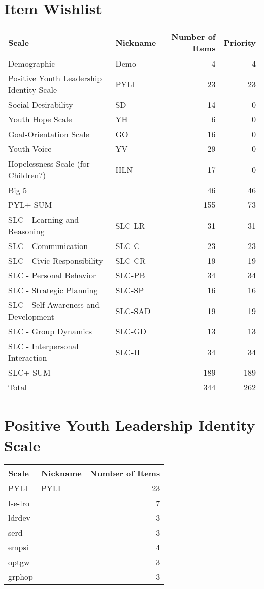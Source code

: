 \documentclass[11pt]{article}
\author{ALEX}
\date{\today}
\title{}
\begin{document}
\tableofcontents

\section{Item Wishlist}
\label{sec:org3b86273}

\begin{center}
\begin{tabular}{llrr}
\hline
Scale & Nickname & Number of Items & Priority\\
\hline
\hline
Demographic & Demo & 4 & 4\\
Positive Youth Leadership Identity Scale & PYLI & 23 & 23\\
Social Desirability & SD & 14 & 0\\
Youth Hope Scale & YH & 6 & 0\\
Goal-Orientation Scale & GO & 16 & 0\\
Youth Voice & YV & 29 & 0\\
Hopelessness Scale (for Children?) & HLN & 17 & 0\\
Big 5 &  & 46 & 46\\
\hline
PYL+ SUM &  & 155 & 73\\
\hline
SLC - Learning and Reasoning & SLC-LR & 31 & 31\\
SLC - Communication & SLC-C & 23 & 23\\
SLC - Civic Responsibility & SLC-CR & 19 & 19\\
SLC - Personal Behavior & SLC-PB & 34 & 34\\
SLC - Strategic Planning & SLC-SP & 16 & 16\\
SLC - Self Awareness and Development & SLC-SAD & 19 & 19\\
SLC - Group Dynamics & SLC-GD & 13 & 13\\
SLC - Interpersonal Interaction & SLC-II & 34 & 34\\
\hline
SLC+ SUM &  & 189 & 189\\
\hline
Total &  & 344 & 262\\
\end{tabular}
\end{center}

\section{Positive Youth Leadership Identity Scale}
\label{sec:org430b08c}

\begin{center}
\begin{tabular}{llr}
Scale & Nickname & Number of Items\\
\hline
PYLI & PYLI & 23\\
\hline
lse-lro &  & 7\\
ldrdev &  & 3\\
serd &  & 3\\
empsi &  & 4\\
optgw &  & 3\\
grphop &  & 3\\
\end{tabular}
\end{center}
\end{document}
